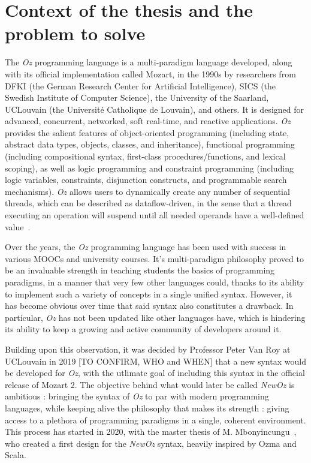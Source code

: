 
\section{Context of the thesis and the problem to solve}\label{sec:ch1-context}
The \textit{Oz} programming language is a multi-paradigm language developed, along with its official implementation called Mozart, in the 1990s by researchers from DFKI (the German Research Center for Artificial Intelligence), SICS (the Swedish Institute of Computer Science), the University of the Saarland, UCLouvain (the Université Catholique de Louvain), and others.
It is designed for advanced, concurrent, networked, soft real-time, and reactive applications.
\textit{Oz} provides the salient features of object-oriented programming (including state, abstract data types, objects, classes, and inheritance),
functional programming (including compositional syntax, first-class procedures/functions, and lexical scoping), as well as
logic programming and constraint programming (including logic variables, constraints, disjunction constructs, and programmable search mechanisms).
\textit{Oz} allows users to dynamically create any number of sequential threads, which can be described as dataflow-driven, in the sense that a thread executing an operation will suspend until all needed operands have a well-defined value~\cite{mozart2tutorial}.\newline

Over the years, the \textit{Oz} programming language has been used with success in various MOOCs and university courses.
It's multi-paradigm philosophy proved to be an invaluable strength in teaching students the basics of programming paradigms, in a manner that very few other languages could, thanks to its ability to implement such a variety of concepts in a single unified syntax.
However, it has become obvious over time that said syntax also constitutes a drawback.
In particular, \textit{Oz} has not been updated like other languages have, which is hindering its ability to keep a growing and active community of developers around it.\newline

Building upon this observation, it was decided by Professor Peter Van Roy at UCLouvain in 2019 [TO CONFIRM, WHO and WHEN] that a new syntax would be developed for \textit{Oz}, with the utlimate goal of including this syntax in the official release of Mozart 2.
The objective behind what would later be called \textit{NewOz} is ambitious : bringing the syntax of \textit{Oz} to par with modern programming languages, while keeping alive the philosophy that makes its strength : giving access to a plethora of programming paradigms in a single, coherent environment.
This process has started in 2020, with the master thesis of M. Mbonyincungu~\cite{jpthesis}, who created a first design for the \textit{NewOz} syntax, heavily inspired by Ozma and Scala.\newline

